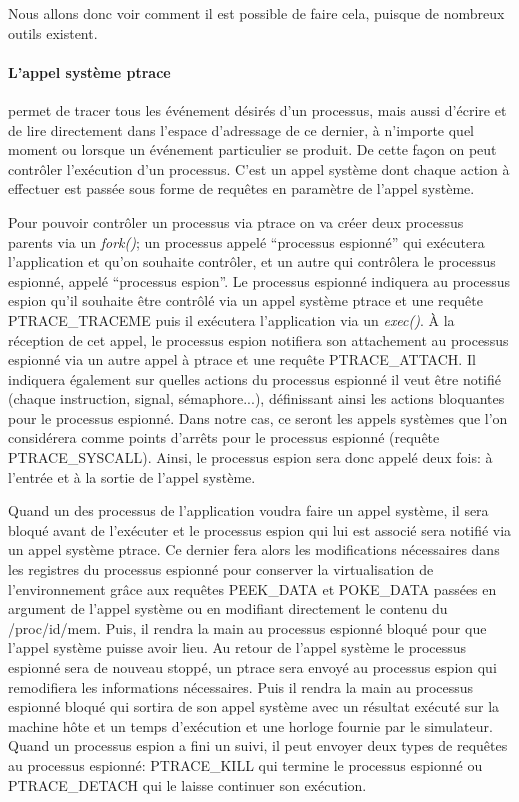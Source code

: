  Nous allons donc voir comment il est possible de faire cela, puisque de
 nombreux outils existent.
 
 \paragraph{L'appel système ptrace}\citet{INTERCEPTIONAS, INTERCEPTIONMARION}
 permet de tracer tous les événement désirés d'un processus, mais aussi d'écrire
 et de lire directement dans l'espace d'adressage de ce dernier, à n'importe
 quel moment ou lorsque un événement particulier se produit. De cette façon on
 peut contrôler l'exécution d'un processus. C'est un appel système dont chaque
 action à effectuer est passée sous forme de requêtes en paramètre de l'appel
 système.

Pour pouvoir contrôler un processus via ptrace on va créer deux processus
parents via un \textit{fork()}; un processus appelé ``processus espionné'' qui
exécutera l'application et qu'on souhaite contrôler, et un autre qui contrôlera
le processus espionné, appelé ``processus espion''. Le processus espionné
indiquera au processus espion qu'il souhaite être contrôlé via un appel système
ptrace et une requête PTRACE\_TRACEME puis il exécutera l'application via un
\textit{exec()}. À la réception de cet appel, le processus espion notifiera son
attachement au processus espionné via un autre appel à ptrace et une requête
PTRACE\_ATTACH. Il indiquera également sur quelles actions du processus espionné
il veut être notifié (chaque instruction, signal, sémaphore...), définissant
ainsi les actions bloquantes pour le processus espionné. Dans notre cas, ce
seront les appels systèmes que l'on considérera comme points d'arrêts pour le
processus espionné (requête PTRACE\_SYSCALL). Ainsi, le processus espion sera
donc appelé deux fois: à l'entrée et à la sortie de l'appel système.

Quand un des processus de l'application voudra faire un appel système, il sera
bloqué avant de l'exécuter et le processus espion qui lui est associé sera
notifié via un appel système ptrace. Ce dernier fera alors les modifications
nécessaires dans les registres du processus espionné pour conserver la
virtualisation de l'environnement grâce aux requêtes PEEK\_DATA et POKE\_DATA
passées en argument de l'appel système {\color{red}ou en modifiant directement
  le contenu du /proc/id/mem}. Puis, il rendra la main au processus espionné
bloqué pour que l'appel système puisse avoir lieu. Au retour de l'appel système
le processus espionné sera de nouveau stoppé, un ptrace sera envoyé au processus
espion qui remodifiera les informations nécessaires. Puis il rendra la main au
processus espionné bloqué qui sortira de son appel système avec un résultat
exécuté sur la machine hôte et un temps d'exécution et une horloge fournie par
le simulateur. Quand un processus espion a fini un suivi, il peut envoyer deux
types de requêtes au processus espionné: PTRACE\_KILL qui termine le processus
espionné ou PTRACE\_DETACH qui le laisse continuer son exécution.

